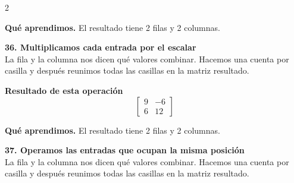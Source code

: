 \documentclass[11pt,a4paper,landscape]{article}
\begin{document}
\begin{multicols*}{2}
\begin{minipage}{\linewidth}
\par\smallskip\textbf{Qué aprendimos.} El resultado tiene 2 filas y 2 columnas.
\end{minipage}\par\medskip
\noindent\begin{minipage}{\linewidth}\textbf{36. Multiplicamos cada entrada por el escalar}\\[2pt]La fila y la columna nos dicen qué valores combinar. Hacemos una cuenta por casilla y después reunimos todas las casillas en la matriz resultado.
\par{}\par\smallskip
\par\smallskip \textbf{Resultado de esta operación}\[\begin{bmatrix}9 & -6\\6 & 12\end{bmatrix}\]
\par\smallskip\textbf{Qué aprendimos.} El resultado tiene 2 filas y 2 columnas.
\end{minipage}\par\medskip
\noindent\begin{minipage}{\linewidth}\textbf{37. Operamos las entradas que ocupan la misma posición}\\[2pt]La fila y la columna nos dicen qué valores combinar. Hacemos una cuenta por casilla y después reunimos todas las casillas en la matriz resultado.
\par{}\par\smallskip

\end{minipage}
\end{multicols*}
\end{document}
